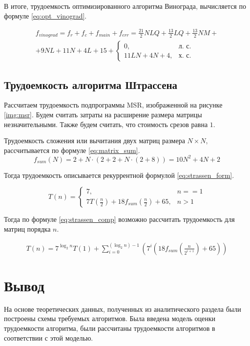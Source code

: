 В итоге, трудоемкость оптимизированного алгоритма Винограда, вычисляется по формуле \eqref{eq:opt_vinograd}.

\begin{equation}
	\label{eq:opt_vinograd}
	\begin{gathered}
		f_{vinograd} = f_{r} + f_{c} + f_{main} + f_{err} = \frac{21}{2}NLQ + \frac{13}{2}LQ + \frac{13}{2} NM + \\
		+ 9NL + 11N + 4L + 15 + 
		\begin{cases}
			0, & \text{л.~с.}\\
			11LN + 4N + 4, & \text{х.~с.}
		\end{cases}
	\end{gathered}
\end{equation}


\subsection{Трудоемкость алгоритма Штрассена}

Рассчитаем трудоемкость подпрограммы MSR, изображенной на рисунке \ref{img:msr}. 
Будем считать затраты на расширение размера матрицы незначительными. 
Также будем считать, что стоимость срезов равна $1$.

Трудоемкость сложения или вычитания двух матриц размера $N \times N$, рассчитывается по формуле \eqref{eq:matrix_sum}.
\begin{equation}
	\label{eq:matrix_sum}
	f_{sum}(N) = 2 + N \cdot (2 + 2 + N \cdot (2 + 8)) = 10N^2 + 4N + 2
\end{equation}

Тогда трудоемкость описывается рекуррентной формулой \eqref{eq:strassen_form}.

\begin{equation}
	\label{eq:strassen_form}
	T(n) = 
	\begin{cases}
		7, & n == 1\\
		7T(\frac{n}{2}) + 18f_{sum}(\frac{n}{2}) + 65, & n > 1
	\end{cases}
\end{equation}

Тогда по формуле \eqref{eq:strassen_comp} возможно рассчитать трудоемкость для матриц порядка $n$.

\begin{equation}
	\label{eq:strassen_comp}
	\begin{gathered}
		T(n) = 7^{\log_{2}{n}} T(1) + \sum_{i=0}^{(\log_{2}{n}) - 1} (7^i (18f_{sum}(\frac{n}{2 ^ {i + 1}}) + 65))
	\end{gathered}
\end{equation}


\section*{Вывод}
На основе теоретических данных, полученных из аналитического раздела были построены схемы требуемых алгоритмов. 
Была введена модель оценки трудоемкости алгоритма, были рассчитаны трудоемкости алгоритмов в соответствии с этой моделью.